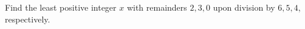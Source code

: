 Find the least positive integer $x$ with remainders $2,3,0$ upon division by $6,5,4$, respectively.
